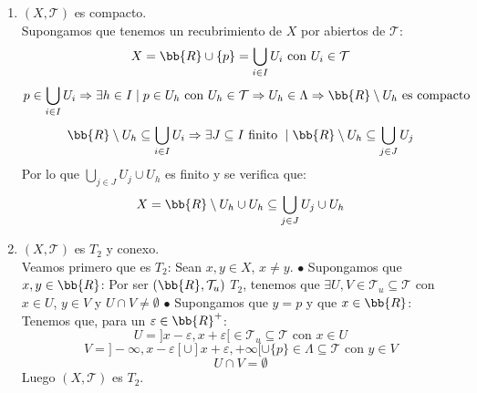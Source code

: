 \documentclass[12pt]{article}
\newcounter{ejercicio}[section] %
\newcounter{ejercicio}
\begin{document}
\begin{ejercicio}[3 puntos]
\begin{enumerate}[label=(\alph*)]
            \item $(X,\mathcal{T})$ es compacto.\\

                \noindent
                Supongamos que tenemos un recubrimiento de $X$ por abiertos de $\mathcal{T}$:
                $$X = \bb{R} \cup \{p\} = \bigcup_{i \in I} U_i \mbox{ con } U_i \in \mathcal{T}$$
                $$p \in \bigcup_{i \in I} U_i \Rightarrow \exists h \in I \mid p \in U_h \mbox{ con } U_h \in \mathcal{T} \Rightarrow U_h \in \Lambda \Rightarrow \bb{R}\setminus U_h \mbox{ es compacto}$$
                $$\bb{R}\setminus U_h \subseteq \bigcup_{i \in I}U_i \Rightarrow \exists J \subseteq I \mbox{ finito } \mid \bb{R}\setminus U_h \subseteq \bigcup_{j \in J} U_j$$
                Por lo que $\displaystyle \bigcup_{j \in J}U_j\cup U_h$ es finito y se verifica que:
                $$X = \bb{R}\setminus U_h \cup U_h \subseteq \bigcup_{j \in J}U_j\cup U_h$$

            \item $(X,\mathcal{T})$ es $T_2$ y conexo.\\

                \noindent
                Veamos primero que es $T_2$:\newline
                Sean $x,y \in X$, $x \neq y$.\newline
                $\bullet$ Supongamos que $x, y \in \bb{R}$:\newline
                Por ser $(\bb{R}, \mathcal{T}_u)$ $T_2$, tenemos que $\exists U, V \in \mathcal{T}_u \subseteq \mathcal{T}$ con $x \in U$, $y \in V$ y $U\cap V \neq \emptyset$
                $\bullet$ Supongamos que $y = p$ y que $x \in \bb{R}$:\newline
                Tenemos que, para un $\varepsilon \in \bb{R}^{+}$:
                $$U = ]x-\varepsilon, x+\varepsilon[ \in \mathcal{T}_u \subseteq \mathcal{T} \mbox{ con } x \in U$$
                $$V = ]-\infty, x-\varepsilon[ \cup ]x+\varepsilon, +\infty[ \cup \{p\} \in \Lambda \subseteq \mathcal{T} \mbox{ con } y \in V$$
                $$U \cap V = \emptyset$$
                Luego $(X, \mathcal{T})$ es $T_2$.\\


\end{enumerate}
\end{ejercicio}
\end{document}
